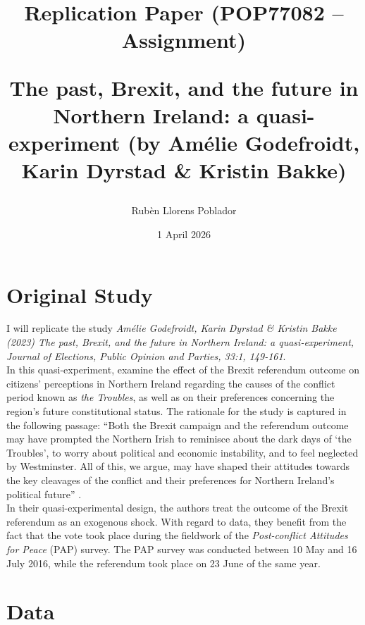 \documentclass[a4paper,12pt]{article}
\begin{document}
	\title{Replication Paper (POP77082 -- Assignment) \\ 
	\begin{large} 
	The past, Brexit, and the future in Northern Ireland: a quasi-experiment (by Amélie Godefroidt, Karin Dyrstad \& Kristin Bakke)
	\end{large} }
	\author{Rubèn Llorens Poblador}
	\date{1 April 2026}
	
	\maketitle
	
	\section{Original Study}

	I will replicate the study \textit{Amélie Godefroidt, Karin Dyrstad \& Kristin Bakke (2023) The past, Brexit,
	and the future in Northern Ireland: a quasi-experiment, Journal of Elections, Public Opinion
	and Parties, 33:1, 149-161}.\\
	
	In this quasi-experiment, \textcite{godefroidt2023past} examine the effect of the Brexit referendum outcome on citizens’ perceptions in Northern Ireland regarding the causes of the conflict period known as \textit{the Troubles}, as well as on their preferences concerning the region’s future constitutional status. The rationale for the study is captured in the following passage: “Both the Brexit campaign and the referendum outcome may have prompted the Northern Irish to reminisce about the dark days of ‘the Troubles’, to worry about political and economic instability, and to feel neglected by Westminster. All of this, we argue, may have shaped their attitudes towards the key cleavages of the conflict and their preferences for Northern Ireland’s political future” \parencite[p. 151]{godefroidt2023past}.\\
	
	In their quasi-experimental design, the authors treat the outcome of the Brexit referendum as an exogenous shock. With regard to data, they benefit from the fact that the vote took place during the fieldwork of the \textit{Post-conflict Attitudes for Peace} (PAP) survey. The PAP survey was conducted between 10 May and 16 July 2016, while the referendum took place on 23 June of the same year.

	\section{Data}
		
\end{document}
